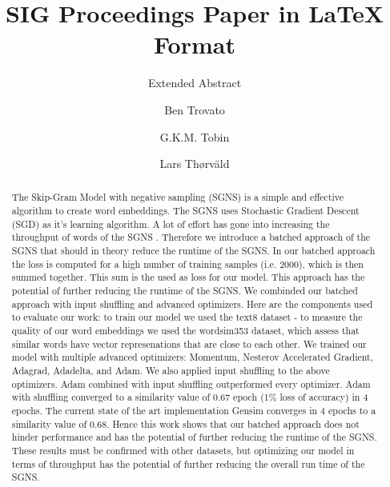 \documentclass[sigconf]{acmart}
\begin{document}
\title{SIG Proceedings Paper in LaTeX Format}
\subtitle{Extended Abstract}


\author{Ben Trovato}

\author{G.K.M. Tobin}


\author{Lars Th{\o}rv{\"a}ld}


\renewcommand{\shortauthors}{B. Trovato et al.}


\begin{abstract}
The Skip-Gram Model with negative sampling (SGNS) is a simple and effective algorithm to create word embeddings. The SGNS uses Stochastic Gradient Descent (SGD) as it's learning algorithm. A lot of effort has gone into increasing the throughput of words of the SGNS .  Therefore we introduce a batched approach of the SGNS that should in theory reduce the runtime of the SGNS. In our batched approach the loss is computed for a high number of training samples (i.e. 2000), which is then summed together. This sum is the used as loss for our model. This approach has the potential of further reducing the runtime of the SGNS. We combinded our batched approach with input shuffling and advanced optimizers. Here are the components used to evaluate our work: to train our model we used the text8 dataset - to measure the quality of our word embeddings we used the wordsim353 dataset, which assess that similar words have vector represenations that are close to each other. We trained our model with multiple advanced optimizers: Momentum, Nesterov Accelerated Gradient, Adagrad, Adadelta, and Adam. We also applied input shuffling to the above optimizers. Adam combined with input shuffling outperformed every optimizer. Adam with shuffling converged to a similarity value of 0.67 epoch (1\% loss of accuracy) in 4 epochs. The current state of the art implementation Gensim converges in 4 epochs to a similarity value of 0.68. Hence this work shows that our batched approach does not hinder performance and has the potential of further reducing the runtime of the SGNS. These results must be confirmed with other datasets, but optimizing our model in terms of throughput has the potential of further reducing the overall run time of the SGNS.


\end{abstract}
\end{document}
